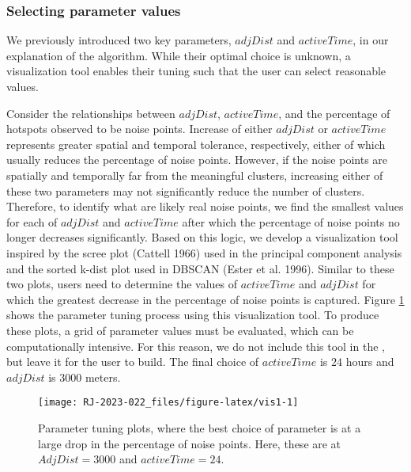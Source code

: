 \hypertarget{selecting-parameter-values}{%
\subsubsection{Selecting parameter values}\label{selecting-parameter-values}}

We previously introduced two key parameters, \(adjDist\) and \(activeTime\), in our explanation of the algorithm. While their optimal choice is unknown, a visualization tool enables their tuning such that the user can select reasonable values.

Consider the relationships between \(adjDist\), \(activeTime\), and the percentage of hotspots observed to be noise points. Increase of either \(adjDist\) or \(activeTime\) represents greater spatial and temporal tolerance, respectively, either of which usually reduces the percentage of noise points. However, if the noise points are spatially and temporally far from the meaningful clusters, increasing either of these two parameters may not significantly reduce the number of clusters. Therefore, to identify what are likely real noise points, we find the smallest values for each of \(adjDist\) and \(activeTime\) after which the percentage of noise points no longer decreases significantly. Based on this logic, we develop a visualization tool inspired by the scree plot (Cattell 1966) used in the principal component analysis and the sorted k-dist plot used in DBSCAN (Ester et al. 1996). Similar to these two plots, users need to determine the values of \(activeTime\) and \(adjDist\) for which the greatest decrease in the percentage of noise points is captured. Figure \ref{fig:vis1} shows the parameter tuning process using this visualization tool. To produce these plots, a grid of parameter values must be evaluated, which can be computationally intensive. For this reason, we do not include this tool in the , but leave it for the user to build. The final choice of \(activeTime\) is \(24\) hours and \(adjDist\) is \(3000\) meters.

\begin{figure}

{\centering \texttt{[image: RJ-2023-022\_files/figure-latex/vis1-1]} 

}

\caption{Parameter tuning plots, where the best choice of parameter is at a large drop in the percentage of noise points. Here, these are at $AdjDist = 3000$ and $activeTime = 24$. }\label{fig:vis1}
\end{figure}

